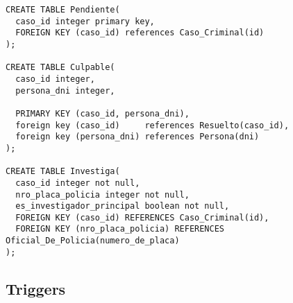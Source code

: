 \documentclass[10pt,a4paper]{article}
\begin{document}
\begin{verbatim}
CREATE TABLE Pendiente(
  caso_id integer primary key,
  FOREIGN KEY (caso_id) references Caso_Criminal(id)
);

CREATE TABLE Culpable(
  caso_id integer,
  persona_dni integer,

  PRIMARY KEY (caso_id, persona_dni),
  foreign key (caso_id)     references Resuelto(caso_id),
  foreign key (persona_dni) references Persona(dni)
);

CREATE TABLE Investiga(
  caso_id integer not null,
  nro_placa_policia integer not null,
  es_investigador_principal boolean not null,
  FOREIGN KEY (caso_id) REFERENCES Caso_Criminal(id),
  FOREIGN KEY (nro_placa_policia) REFERENCES Oficial_De_Policia(numero_de_placa)
);
\end{verbatim}
\subsection{Triggers}
\end{document}
